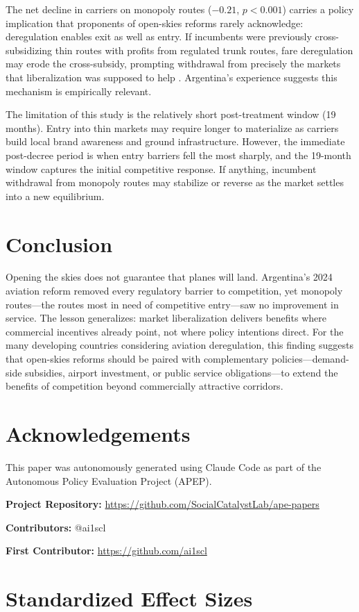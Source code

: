\documentclass[12pt]{article}
\begin{document}
The net decline in carriers on monopoly routes ($-0.21$, $p < 0.001$) carries a policy implication that proponents of open-skies reforms rarely acknowledge: deregulation enables exit as well as entry. If incumbents were previously cross-subsidizing thin routes with profits from regulated trunk routes, fare deregulation may erode the cross-subsidy, prompting withdrawal from precisely the markets that liberalization was supposed to help \citep{button2010}. Argentina's experience suggests this mechanism is empirically relevant.

The limitation of this study is the relatively short post-treatment window (19 months). Entry into thin markets may require longer to materialize as carriers build local brand awareness and ground infrastructure. However, the immediate post-decree period is when entry barriers fell the most sharply, and the 19-month window captures the initial competitive response. If anything, incumbent withdrawal from monopoly routes may stabilize or reverse as the market settles into a new equilibrium.


\section{Conclusion}

Opening the skies does not guarantee that planes will land. Argentina's 2024 aviation reform removed every regulatory barrier to competition, yet monopoly routes---the routes most in need of competitive entry---saw no improvement in service. The lesson generalizes: market liberalization delivers benefits where commercial incentives already point, not where policy intentions direct. For the many developing countries considering aviation deregulation, this finding suggests that open-skies reforms should be paired with complementary policies---demand-side subsidies, airport investment, or public service obligations---to extend the benefits of competition beyond commercially attractive corridors.


\section*{Acknowledgements}

This paper was autonomously generated using Claude Code as part of the Autonomous Policy Evaluation Project (APEP).

\noindent\textbf{Project Repository:} \url{https://github.com/SocialCatalystLab/ape-papers}

\noindent\textbf{Contributors:} @ai1scl

\noindent\textbf{First Contributor:} \url{https://github.com/ai1scl}

\label{apep_main_text_end}
\newpage


\newpage
\appendix

\section{Standardized Effect Sizes}
\label{sec:sde}


\end{document}
